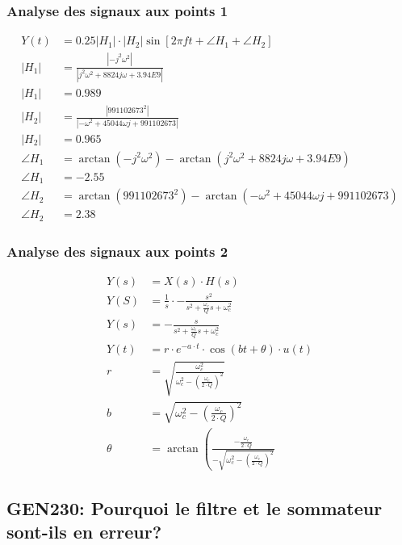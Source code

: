 \documentclass[10pt]{beamer}\usepackage[]{graphicx}\usepackage[]{xcolor}
\begin{document}
\begin{frame}
\frametitle{Analyse des signaux aux points 1}
\footnotesize
\begin{align}
  Y(t)&=0.25\left|H_{1}\right|\cdot\left|H_{2}\right| \sin \left[2 \pi f t+\angle H_{1}+\angle H_{2}\right] \\
  \left|H_{1}\right|&=\frac{\left|-j^{2} \omega^{2}\right|}{\left|j^{2} \omega^{2}+8824 j \omega+3.94 E 9\right|} \\
  \left|H_{1}\right|&=0.989 \\
  \left|H_{2}\right|&=\frac{\left|991102673^{2}\right|}{\left|-\omega^{2}+45044 \omega j+991102673\right|} \\
  \left|H_{2}\right|&=0.965 \\
  \angle H_{1}&=\arctan \left(-j^{2} \omega^{2}\right)-\arctan \left(j^{2} \omega^{2}+8824 j \omega+3.94 E 9\right) \\
  \angle H_{1}&=-2.55 \\
  \angle H_{2}&=\arctan \left(991102673^{2}\right)-\arctan \left(-\omega^{2}+45044 \omega j+991102673\right) \\
  \angle H_{2}&=2.38
\end{align}
\end{frame}

\begin{frame}
\frametitle{Analyse des signaux aux points 2}
\footnotesize
\begin{align}
  Y(s)&=X(s) \cdot H(s) \\
  Y(S)&=\frac{1}{s} \cdot-\frac{s^{2}}{s^{2}+\frac{\omega_{c}}{Q} s+\omega_{c}^{2}} \\
  Y(s)&=-\frac{s}{s^{2}+\frac{\omega_{c}}{Q} s+\omega_{c}^{2}} \\
  Y(t)&=r \cdot e^{-a \cdot t} \cdot \cos (b t+\theta) \cdot u(t) \\
  r&=\sqrt{\frac{\omega_{c}^{2}}{\omega_{c}^{2}-\left(\frac{\omega_{c}}{2 \cdot Q}\right)^{2}}} \\
  b&=\sqrt{\omega_{c}^{2}-\left(\frac{\omega_{c}}{2 \cdot Q}\right)^{2}} \\
  \theta&=\arctan \left(\frac{-\frac{\omega_{c}}{2 \cdot Q}}{-\sqrt{\omega_{c}^{2}-\left(\frac{\omega_{c}}{2 \cdot Q}\right)^{2}}}\right.
\end{align}
\end{frame}

\subsection{GEN230: Pourquoi le filtre et le sommateur sont-ils en erreur?}
\end{document}
